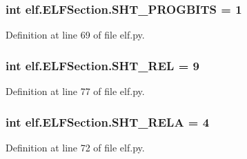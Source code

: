 \subsubsection[{\texorpdfstring{S\+H\+T\+\_\+\+P\+R\+O\+G\+B\+I\+TS}{SHT_PROGBITS}}]{\setlength{\rightskip}{0pt plus 5cm}int elf.\+E\+L\+F\+Section.\+S\+H\+T\+\_\+\+P\+R\+O\+G\+B\+I\+TS = 1\hspace{0.3cm}{\ttfamily [static]}}\hypertarget{clasself_1_1_e_l_f_section_a8bc8b2f23a47e4b9c3159e5e278017c8}{}\label{clasself_1_1_e_l_f_section_a8bc8b2f23a47e4b9c3159e5e278017c8}


Definition at line 69 of file elf.\+py.

\subsubsection[{\texorpdfstring{S\+H\+T\+\_\+\+R\+EL}{SHT_REL}}]{\setlength{\rightskip}{0pt plus 5cm}int elf.\+E\+L\+F\+Section.\+S\+H\+T\+\_\+\+R\+EL = 9\hspace{0.3cm}{\ttfamily [static]}}\hypertarget{clasself_1_1_e_l_f_section_ab6d3168d4ea41598cca63f9cf600aa80}{}\label{clasself_1_1_e_l_f_section_ab6d3168d4ea41598cca63f9cf600aa80}


Definition at line 77 of file elf.\+py.

\subsubsection[{\texorpdfstring{S\+H\+T\+\_\+\+R\+E\+LA}{SHT_RELA}}]{\setlength{\rightskip}{0pt plus 5cm}int elf.\+E\+L\+F\+Section.\+S\+H\+T\+\_\+\+R\+E\+LA = 4\hspace{0.3cm}{\ttfamily [static]}}\hypertarget{clasself_1_1_e_l_f_section_a344f870ef51b681d38762468efde63af}{}\label{clasself_1_1_e_l_f_section_a344f870ef51b681d38762468efde63af}


Definition at line 72 of file elf.\+py.

